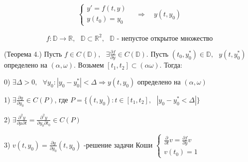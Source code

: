 \documentclass[12pt, a4paper]{report}
\begin{document}
\[ \begin{aligned}
    \begin{cases}
        y ' = f(t, y ) \\ 
        y(t_0 )= y_0 
        \end{cases} 
        \quad \Rightarrow \quad  y (t, y_0 )
\end{aligned} \] 

\[ f: \mathbb{D} \to  \mathbb{R} , \text{ }  \mathbb{D} \subset \mathbb{R} ^2 , \text{ }  \mathbb{D} \text{  - непустое открытое множество}  \] 

\begin{theorem}(Теорема 4.)
    Пусть \( f \in  C (\mathbb{D} ) , \text{ } \exists \frac{\partial  f }{\partial  y } \in  C(\mathbb{D} )   \). Пусть \( (t_0 , y_0 ^* ) \in  \mathbb{D} , \text{  } y(t ,y_0^* ) \) определено на \( (\alpha , \omega ) \). Возьмем \( [t_1,t_2 ] \subset (\alpha \omega ) \). Тогда: 
    
    0) \( \exists  \Delta > 0 , \text{ } \forall  y_0 : |y_0 - y_0 ^* | < \Delta \Rightarrow y(t, y_0 )  \)  определено на \( (\alpha , \omega) \) 

    1) \( \exists \frac{\partial  y }{\partial  y_0 } \in  C (P )  \), где \( P = \{(t, y_0 ): t \in  [t_1 ,t_2 ] , \text{ } |y_0 - y_0 ^* < \Delta|\} \)  

    2) \( \exists  \frac{\partial  ^2 y }{\partial  \mu \partial  t }  = \frac{\partial  ^2 y }{\partial  y_0 \partial  t_0 } \in C(P) \) 

    3) \( v(t, y_0 ) = \frac{\partial  y }{\partial  y_0 } (t,y_0 )   \)  -решение задачи Коши \( \begin{cases}
    \displaystyle \frac{\partial  }{\partial  t }v = \frac{\partial  f }{\partial  y } v  \\ 
    v (t_0 ) =1   
    \end{cases} \) 
\end{theorem}






\ifdefined\mainfile
\else
    
\end{document}
